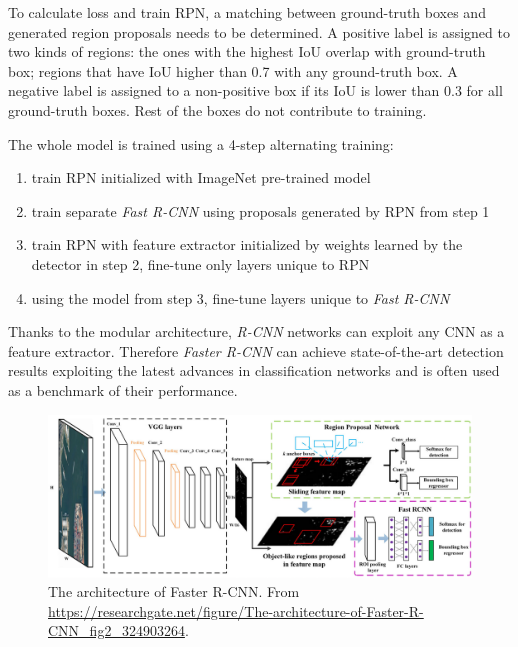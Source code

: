 To calculate loss and train RPN, a matching between ground-truth boxes and generated region proposals needs to be determined. A positive label is assigned to two kinds of regions: the ones with the highest IoU overlap with ground-truth box; regions that have IoU higher than 0.7 with any ground-truth box. A negative label is assigned to a non-positive box if its IoU is lower than 0.3 for all ground-truth boxes. Rest of the boxes do not contribute to training. 
 
 The whole model is trained using a 4-step alternating training:
 
 \begin{enumerate}
     \item train RPN initialized with ImageNet pre-trained model
     \item train separate \textit{Fast R-CNN} using proposals generated by RPN from step 1
     \item train RPN with feature extractor initialized by weights learned by the detector in step 2, fine-tune only layers unique to RPN
     \item using the model from step 3, fine-tune layers unique to \textit{Fast R-CNN}
 \end{enumerate}

Thanks to the modular architecture, \textit{R-CNN} networks can exploit any CNN as a feature extractor.  Therefore \textit{Faster R-CNN} can achieve state-of-the-art detection results exploiting the latest advances in classification networks and is often used as a benchmark of their performance.
     

 \begin{figure}
     \centering
     \includegraphics[width=\textwidth]{img/fasterrcnn}
     \caption{The architecture of Faster R-CNN. From \url{https://researchgate.net/figure/The-architecture-of-Faster-R-CNN\_fig2\_324903264}.}
     \label{fig:fasterrcnn}
 \end{figure}

